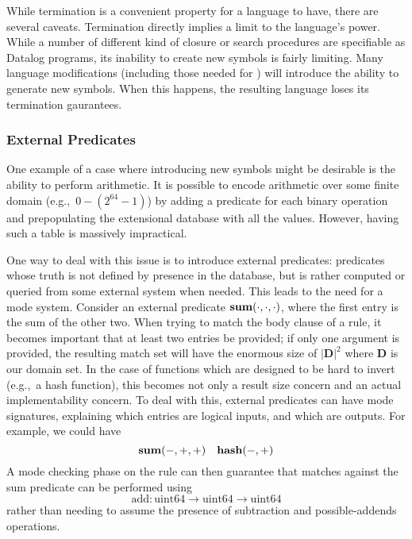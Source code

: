 While termination is a convenient property for a language to have, there are several caveats.
%
Termination directly implies a limit to the language's power.
While a number of different kind of closure or search procedures are specifiable as Datalog programs, its inability to create new symbols is fairly limiting.
%
Many language modifications (including those needed for \sysname) will introduce the ability to generate new symbols.
When this happens, the resulting language loses its termination gaurantees.
\subsubsection{External Predicates}
\label{sec:extpred}
One example of a case where introducing new symbols might be desirable is the ability to perform arithmetic.
It is possible to encode arithmetic over some finite domain (e.g.,\ $0-(2^{64} - 1)$) by adding a predicate for each binary operation and prepopulating the extensional database with all the values.
However, having such a table is massively impractical.

One way to deal with this issue is to introduce external predicates: predicates whose truth is not defined by presence in the database, but is rather computed or queried from some external system when needed.
This leads to the need for a mode system.
Consider an external predicate ${\bf sum}(\cdot, \cdot, \cdot)$, where the first entry is the sum of the other two.
When trying to match the body clause of a rule, it becomes important that at least two entries be provided; if only one argument is provided, the resulting match set will have the enormous size of $|\mathbf{D}|^2$ where $\mathbf{D}$ is our domain set.
In the case of functions which are designed to be hard to invert (e.g.,\ a hash function), this becomes not only a result size concern and an actual implementability concern.
To deal with this, external predicates can have mode signatures, explaining which entries are logical inputs, and which are outputs. For example, we could have
\[
        {\bf sum}(-, +, +) \quad {\bf hash}(-, +)
\]
A mode checking phase on the rule can then guarantee that matches against the sum predicate can be performed using
\[
        \textrm{add} : \textrm{uint64} \rightarrow \textrm{uint64} \rightarrow \textrm{uint64}
\]
rather than needing to assume the presence of subtraction and possible-addends operations.

